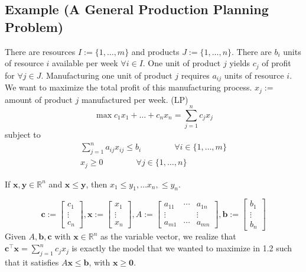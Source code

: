 \subsection{Example (A General Production Planning Problem)}
There are resources $I:=\{1,\dots,m\}$ and products $J:=\{1,\dots,n\}$. 
There are $b_i$ units of resource
$i$ available per week $\forall i\in I$. One unit of product $j$ yields $c_j$ of profit for
$\forall j\in J$. Manufacturing one unit of product $j$ requires $a_{ij}$ units of resource $i$.
We want to maximize the total profit of this manufacturing process.
$x_j :=$ amount of product $j$ manufactured per week. (LP)
\[\max c_1x_1 + \dots + c_nx_n = \sum\limits_{j=1}^n c_jx_j\]
subject to
\begin{align*}
    \sum\limits_{j=1}^n a_{ij}x_{ij}\le b_i \qquad\qquad\forall i\in\{1,\dots,m\}\\
    x_{j}\ge 0 \qquad\qquad\forall j\in\{1,\dots,n\}
\end{align*}

\begin{remark}
    If $\mathbf{x},\mathbf{y}\in\mathbb{R}^n$ and $\mathbf{x}\le \mathbf{y}$, then
    $x_1\le y_1, \dots x_n, \le y_n$.
\end{remark}

\begin{remark}
\[
\mathbf{c}:=\left[\begin{array}{c}{c_{1}} \\ {\vdots} \\ {c_{n}}\end{array}\right],
\mathbf{x}:=\left[\begin{array}{c}{x_{1}} \\ {\vdots} \\ {x_{n}}\end{array}\right],
A:=\left[\begin{array}{cccc}
    {a_{11}} & \cdots & {a_{1 n}} \\
    \vdots & & \vdots \\
     {a_{m 1}} & \cdots & {a_{m n}}
    \end{array}\right],
\mathbf{b}:=\left[\begin{array}{c}{b_{1}} \\ {\vdots} \\ {b_{n}}\end{array}\right]
\]
Given $A,\mathbf{b},\mathbf{c}$ with $\mathbf{x}\in\mathbb{R}^n$ as the variable vector, we realize that
$\mathbf{c}^\top  \mathbf{x}=\sum\limits_{j=1}^n c_jx_j$ is exactly the model that we wanted to maximize
in 1.2 such that it satisfies $A\mathbf{x}\le \mathbf{b}$, with $\mathbf{x}\ge \mathbf{0}$.
\end{remark}

